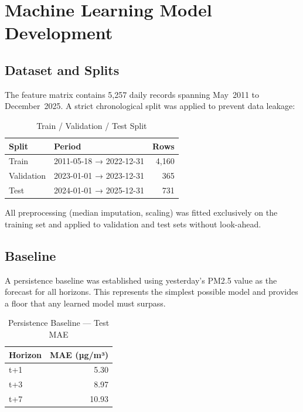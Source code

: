 \chapter{Machine Learning Model Development}
\label{ch:ml-development}

\section{Dataset and Splits}

The feature matrix contains 5,257 daily records spanning May~2011 to
December~2025. A strict chronological split was applied to prevent data leakage:

\begin{table}[H]
\centering
\caption{Train / Validation / Test Split}
\begin{tabular}{llr}
\toprule
\textbf{Split} & \textbf{Period} & \textbf{Rows} \\
\midrule
Train      & 2011-05-18 → 2022-12-31 & 4,160 \\
Validation & 2023-01-01 → 2023-12-31 &   365 \\
Test       & 2024-01-01 → 2025-12-31 &   731 \\
\bottomrule
\end{tabular}
\end{table}

All preprocessing (median imputation, scaling) was fitted exclusively on the
training set and applied to validation and test sets without look-ahead.

\section{Baseline}

A persistence baseline was established using yesterday's PM2.5 value as the
forecast for all horizons. This represents the simplest possible model and
provides a floor that any learned model must surpass.

\begin{table}[H]
\centering
\caption{Persistence Baseline — Test MAE}
\begin{tabular}{lr}
\toprule
\textbf{Horizon} & \textbf{MAE (µg/m³)} \\
\midrule
t+1 & 5.30 \\
t+3 & 8.97 \\
t+7 & 10.93 \\
\bottomrule
\end{tabular}
\end{table}

